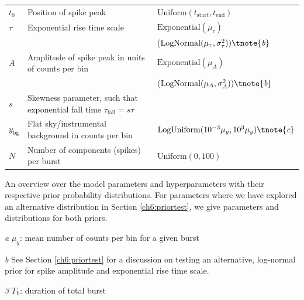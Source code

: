 \documentclass[12pt]{emulateapj}
\newcommand{\counts}{y}
\begin{document}
\begin{table}[hbtp]
\begin{threeparttable}
\begin{tabularx}{\textwidth}{p{2.0cm}p{10.0cm}X}
$t_0$ & Position of spike peak & $\mathrm{Uniform}(t_{\mathrm{start}}, t_{\mathrm{end}})$ \\
$\tau$ & Exponential rise time scale & $\mathrm{Exponential}(\mu_\tau)$ \\
 && ($\mathrm{LogNormal}(\mu_\tau, \sigma^2_{\tau}))\tnote{\emph{b}} $ \\
$A$ & Amplitude of spike peak in units of counts per bin &$\mathrm{Exponential}(\mu_A)$ \\
 && ($\mathrm{LogNormal}(\mu_A, \sigma^2_{A}))\tnote{\emph{b}} $ \\ 
$s$ & Skewness parameter, such that exponential fall time $\tau_{\mathrm{fall}} = s\tau$ & \\
$\counts_{\mathrm{bg}}$ & Flat sky/instrumental background in counts per bin & $\mathrm{LogUniform}(10^{-3}\mu_\counts, 10^3\mu_\counts)\tnote{\emph{c}}$ \\
$N$ & Number of components (spikes) per burst & $\mathrm{Uniform}(0,100)$  \\\bottomrule
\end{tabularx}
   \begin{tablenotes}
      \item{An overview over the model parameters and hyperparameters with their respective prior probability distributions. For parameters where we have explored an alternative distribution in Section 
\ref{ch6:priortest}, we give parameters and distributions for both priors.}
      \item[\emph{a}]{$\mu_\counts$: mean number of counts per bin for a given burst}
     \item[\emph{b}]{See Section \ref{ch6:priortest} for a discussion on testing an alternative, log-normal prior for spike amplitude and exponential rise time scale.}
     \item[\emph{3}]{$T_\mathrm{b}$: duration of total burst}
\end{tablenotes}
\end{threeparttable}
\label{tab:priortable}
\end{table}
\end{document}
